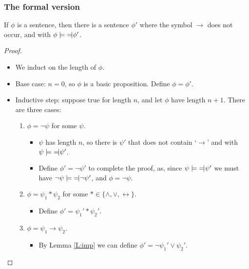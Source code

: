 \documentclass[handout]{beamer}
\newcommand{\lequiv}{\models\text{\reflectbox{$\models$}}}
\begin{document}
\begin{frame}
\frametitle{The formal version}
\begin{corollary}\label{C:imp}
If $\phi$ is a sentence, then there is a sentence $\phi'$ where the symbol $\rightarrow$ does not occur, and with $\phi\lequiv \phi'$.
\end{corollary}
\begin{proof}
\begin{itemize}
\item We induct on the length of $\phi$. 
\item Base case: $n=0$, so $\phi$ is a basic proposition. Define $\phi = \phi'$.
\item Inductive step: suppose true for length $n$, and let $\phi$ have length $n+1$. There are three cases:
\begin{enumerate}
\item $\phi = \neg \psi$ for some $\psi$.
\begin{itemize}
\item  $\psi$ has length $n$, so there is $\psi'$ that does not contain `$\rightarrow$' and with $\psi\lequiv \psi'$. 
\item Define $\phi'=\neg\psi'$ to complete the proof, as, since $\psi\lequiv \psi'$ we must have $\neg\psi\lequiv \neg\psi'$, and $\phi=\neg\psi$.
\end{itemize}
\item $\phi = \psi_1*\psi_2$ for some $*\in\{\wedge,\vee,\leftrightarrow\}$. 
\begin{itemize}
\item Define $\phi'=\psi_1'*\psi_2'$.
\end{itemize}
\item $\phi = \psi_1\rightarrow \psi_2$. 
\begin{itemize}
\item By Lemma \ref{L:imp} we can define $\phi'=\neg\psi_1'\vee \psi_2'$.
\end{itemize}
\end{enumerate} 
\end{itemize}
\end{proof}
\end{frame}
\end{document}
